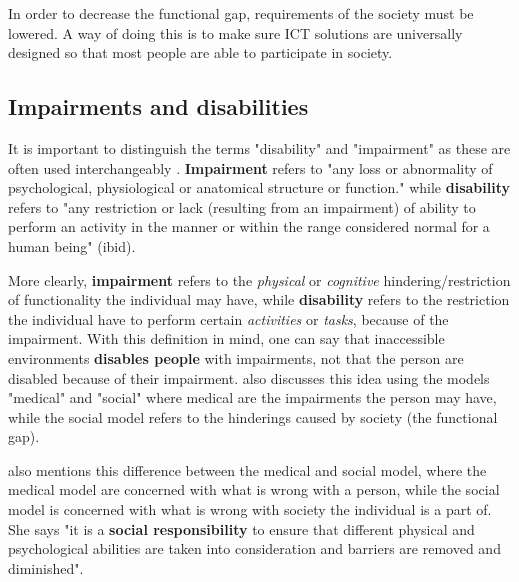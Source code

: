     In order to decrease the functional gap, requirements of the society must be lowered. A way of doing this is to make sure ICT solutions are universally designed so that most people are able to participate in society. 

\fi

\subsection{Impairments and disabilities}
It is important to distinguish the terms "disability" and "impairment" as these are often used interchangeably \parencite{sheena_l._carter_impairment_????}. \textbf{Impairment} refers to "any loss or abnormality of psychological, physiological or anatomical structure or function." while \textbf{disability} refers to "any restriction or lack (resulting from an impairment) of ability to perform an activity in the manner or within the range considered normal for a human being" (ibid). 

More clearly, \textbf{impairment} refers to the \textit{physical} or \textit{cognitive} hindering/restriction of functionality the individual may have, while \textbf{disability} refers to the restriction the individual have to perform certain \textit{activities} or \textit{tasks}, because of the impairment. With this definition in mind, one can say that inaccessible environments \textbf{disables people} with impairments, not that the person are disabled because of their impairment. \textcite{world_health_organization_world_2011} also discusses this idea using the models "medical" and "social" where medical are the impairments the person may have, while the social model refers to the hinderings caused by society (the functional gap).


\textcite{begnum_universal_2017} also mentions this difference between the medical and social model, where the medical model are concerned with what is wrong with a person, while the social model is concerned with what is wrong with society the individual is a part of. She says "it is a \textbf{social responsibility} to ensure that different physical and psychological abilities are taken into consideration and barriers are removed and diminished". 





